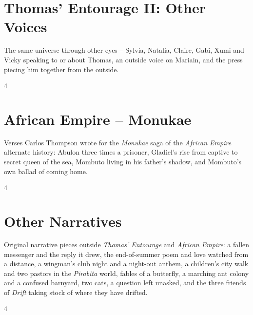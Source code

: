\documentclass[a4paper,landscape]{memoir}
\begin{document}
\chapter{Thomas' Entourage II: Other Voices}
The same universe through other eyes -- Sylvia, Natalia, Claire, Gabi, Xumi and Vicky speaking to or about Thomas, an outside voice on Mariain, and the press piecing him together from the outside.
\clearpage\begin{multicols*}{4}










\end{multicols*}

\chapter{African Empire -- Monukae}
Verses Carlos Thompson wrote for the \emph{Monukae} saga of the \emph{African Empire} alternate history: Abulon three times a prisoner, Gladiel's rise from captive to secret queen of the sea, Mombuto living in his father's shadow, and Mombuto's own ballad of coming home.
\clearpage\begin{multicols*}{4}




\end{multicols*}

\chapter{Other Narratives}
Original narrative pieces outside \emph{Thomas’ Entourage} and \emph{African Empire}: a fallen messenger and the reply it drew, the end-of-summer poem and love watched from a distance, a wingman's club night and a night-out anthem, a children's city walk and two pastors in the \emph{Pirabita} world, fables of a butterfly, a marching ant colony and a confused barnyard, two cats, a question left unasked, and the three friends of \emph{Drift} taking stock of where they have drifted.
\clearpage\begin{multicols*}{4}


%















\end{multicols*}
\end{document}

